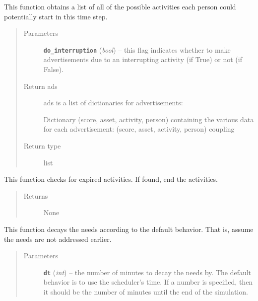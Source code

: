\documentclass[letterpaper,10pt,english]{sphinxmanual}
\begin{document}
\begin{fulllineitems}

\begin{fulllineitems}
\label{universe:universe.Universe.advertise}
This function obtains a list of all of the possible activities each person could potentially start in         this time step.
\begin{quote}\begin{description}
\item[{Parameters}] \leavevmode
\textbf{\texttt{do\_interruption}} (\emph{bool}) -- this flag indicates whether to make advertisements due to an         interrupting activity (if True) or not (if False).

\item[{Return ads}] \leavevmode
ads is a list of dictionaries for advertisements:

Dictionary  (score, asset, activity, person) containing the various data for
each advertisement: (score, asset, activity, person) coupling

\item[{Return type}] \leavevmode
list

\end{description}\end{quote}

\end{fulllineitems}


\begin{fulllineitems}
\label{universe:universe.Universe.check_expired_activities}
This function checks for expired activities. If found, end the activities.
\begin{quote}\begin{description}
\item[{Returns}] \leavevmode
None

\end{description}\end{quote}

\end{fulllineitems}


\begin{fulllineitems}
\label{universe:universe.Universe.decay_needs}
This function decays the needs according to the default behavior. That is, assume the needs are not         addressed earlier.
\begin{quote}\begin{description}
\item[{Parameters}] \leavevmode
\textbf{\texttt{dt}} (\emph{int}) -- the number of minutes to decay the needs by. The default behavior is to use the scheduler's         time. If a number is specified, then it should be the number of minutes until the end of the simulation.


\end{description}
\end{quote}
\end{fulllineitems}
\end{fulllineitems}
\end{document}
